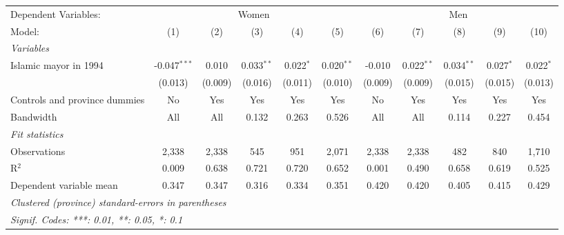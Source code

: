 
\begingroup
\centering
\begin{adjustbox}{max width=\textwidth}
   \begin{tabular}{lcccccccccc}
      \tabularnewline \midrule \midrule
      Dependent Variables: & \multicolumn{5}{c}{Women} & \multicolumn{5}{c}{Men}\\
      Model:                        & (1)            & (2)     & (3)          & (4)         & (5)          & (6)     & (7)          & (8)          & (9)         & (10)\\  
      \midrule
      \emph{Variables}\\
      Islamic mayor in 1994         & -0.047$^{***}$ & 0.010   & 0.033$^{**}$ & 0.022$^{*}$ & 0.020$^{**}$ & -0.010  & 0.022$^{**}$ & 0.034$^{**}$ & 0.027$^{*}$ & 0.022$^{*}$\\   
                                    & (0.013)        & (0.009) & (0.016)      & (0.011)     & (0.010)      & (0.009) & (0.009)      & (0.015)      & (0.015)     & (0.013)\\   
      Controls and province dummies & No             & Yes     & Yes          & Yes         & Yes          & No      & Yes          & Yes          & Yes         & Yes\\  
      Bandwidth                     & All            & All     & 0.132        & 0.263       & 0.526        & All     & All          & 0.114        & 0.227       & 0.454\\  
      \midrule
      \emph{Fit statistics}\\
      Observations                  & 2,338          & 2,338   & 545          & 951         & 2,071        & 2,338   & 2,338        & 482          & 840         & 1,710\\  
      R$^2$                         & 0.009          & 0.638   & 0.721        & 0.720       & 0.652        & 0.001   & 0.490        & 0.658        & 0.619       & 0.525\\  
      Dependent variable mean       & 0.347          & 0.347   & 0.316        & 0.334       & 0.351        & 0.420   & 0.420        & 0.405        & 0.415       & 0.429\\  
      \midrule \midrule
      \multicolumn{11}{l}{\emph{Clustered (province) standard-errors in parentheses}}\\
      \multicolumn{11}{l}{\emph{Signif. Codes: ***: 0.01, **: 0.05, *: 0.1}}\\
   \end{tabular}
\end{adjustbox}
\par\endgroup


